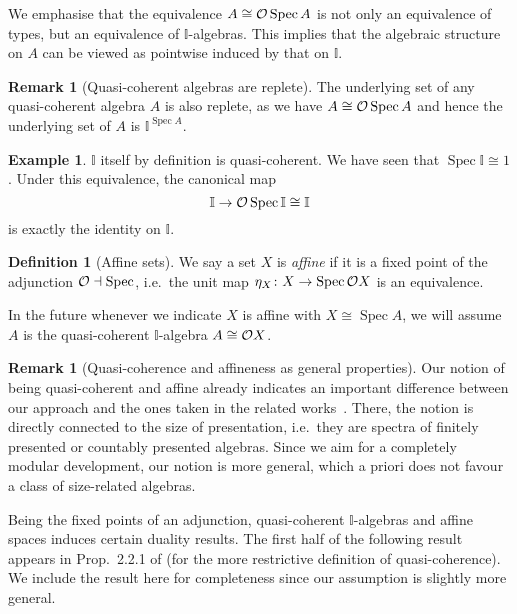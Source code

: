 \documentclass[a4paper,12pt]{amsart}
\theoremstyle{definition}
\newtheorem{example}[theorem]{Example}
\newtheorem{definition}[theorem]{Definition}
\newtheorem{remark}[theorem]{Remark}
\newcommand{\mbb}[1]{\mathbb{#1}}
\newcommand{\I}{\mbb I}
\newcommand{\spec}{\operatorname{Spec}}
\begin{document}
We emphasise that the equivalence $A \cong \opens\spec A$ is not only an equivalence of types, but an equivalence of $\I$-algebras. This implies that the algebraic structure on $A$ can be viewed as pointwise induced by that on $\I$. 

\begin{remark}[Quasi-coherent algebras are replete]\label{rem:qcreplete}
  The underlying set of any quasi-coherent algebra $A$ is also replete, as we have $A\cong \opens\spec{A}$ and hence the underlying set of $A$ is $\I^{\spec{A}}$.
\end{remark}

\begin{example}\label{exm:intervalqc}
  $\I$ itself by definition is quasi-coherent. We have seen that $\spec \I \cong 1$. Under this equivalence, the canonical map 
  \[ \I \to \opens\spec \I \cong \I \]
  is exactly the identity on $\I$.
\end{example}

\begin{definition}[Affine sets]
  We say a set $X$ is \emph{affine} if it is a fixed point of the adjunction $\opens \dashv \spec$, i.e.\ the unit map $\eta_X\colon X \to \spec\opens X$ is an equivalence.
\end{definition}

In the future whenever we indicate $X$ is affine with $X \cong \spec A$, we will assume $A$ is the quasi-coherent $\I$-algebra $A \cong \mathcal{O} X$.

\begin{remark}[Quasi-coherence and affineness as general properties]
  Our notion of being quasi-coherent and affine already indicates an important difference between our approach and the ones taken in the related works~\citep{Cherubini_Coquand_Hutzler_2024,cherubini2024foundation}. There, the notion is directly connected to the size of presentation, i.e.\ they are spectra of finitely presented or countably presented algebras. Since we aim for a completely modular development, our notion is more general, which a priori does not favour a class of size-related algebras. 
\end{remark}

Being the fixed points of an adjunction, quasi-coherent $\I$-algebras and affine spaces induces certain duality results. The first half of the following result appears in Prop.~2.2.1 of \citet{Cherubini_Coquand_Hutzler_2024} (for the more restrictive definition of quasi-coherence). We include the result here for completeness since our assumption is slightly more general.
\end{document}
